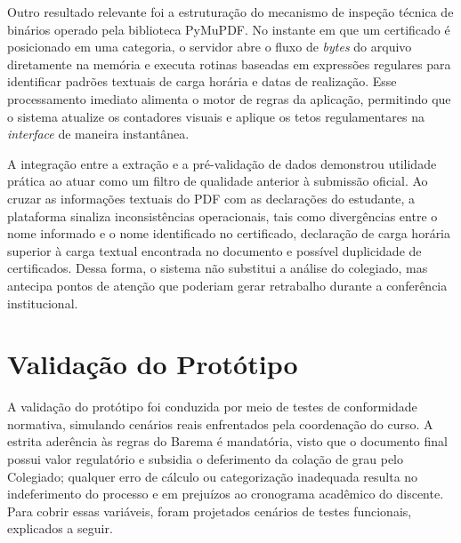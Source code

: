 
Outro resultado relevante foi a estruturação do mecanismo de inspeção técnica de binários operado pela biblioteca PyMuPDF\texttrademark{}. No instante em que um certificado é posicionado em uma categoria, o servidor abre o fluxo de \textit{bytes} do arquivo diretamente na memória e executa rotinas baseadas em expressões regulares para identificar padrões textuais de carga horária e datas de realização. Esse processamento imediato alimenta o motor de regras da aplicação, permitindo que o sistema atualize os contadores visuais e aplique os tetos regulamentares na \textit{interface} de maneira instantânea.

A integração entre a extração e a pré-validação de dados demonstrou utilidade prática ao atuar como um filtro de qualidade anterior à submissão oficial. Ao cruzar as informações textuais do PDF com as declarações do estudante, a plataforma sinaliza inconsistências operacionais, tais como divergências entre o nome informado e o nome identificado no certificado, declaração de carga horária superior à carga textual encontrada no documento e possível duplicidade de certificados. Dessa forma, o sistema não substitui a análise do colegiado, mas antecipa pontos de atenção que poderiam gerar retrabalho durante a conferência institucional.


\section{Validação do Protótipo}

A validação do protótipo foi conduzida por meio de testes de conformidade normativa, simulando cenários reais enfrentados pela coordenação do curso. A estrita aderência às regras do Barema é mandatória, visto que o documento final possui valor regulatório e subsidia o deferimento da colação de grau pelo Colegiado; qualquer erro de cálculo ou categorização inadequada resulta no indeferimento do processo e em prejuízos ao cronograma acadêmico do discente. Para cobrir essas variáveis, foram projetados cenários de testes funcionais, explicados a seguir.


